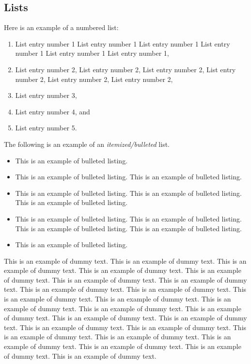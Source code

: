 \documentclass{jpp}
\begin{document}
\subsection{Lists}

Here is an example of a numbered list:

\begin{enumerate}
\item[1.] List entry number 1 List entry number 1 List entry number 1 List entry number 1 List
entry number 1 List entry number 1,
\item[2.] List entry number 2, List entry number 2, List entry number 2, List entry number 2, List
entry number 2, List entry number 2,
\item[3.] List entry number 3,
\item[4.] List entry number 4, and
\item[5.] List entry number 5.
\end{enumerate}

The following is an example of an \textit{itemized/bulleted} list.

\begin{itemize}
\item This is an example of bulleted listing.
\item This is an example of bulleted listing. This is an example of bulleted listing.
\item This is an example of bulleted listing. This is an example of bulleted listing. This is an
example of bulleted listing.
\item This is an example of bulleted listing. This is an example of bulleted listing. This is an
example of bulleted listing. This is an example of bulleted listing.
\item This is an example of bulleted listing.
\end{itemize}

This is an example of dummy text. This is an example of dummy text. This is an example
of dummy text. This is an example of dummy text. This is an example of dummy text. This is
an example of dummy text. This is an example of dummy text. This is an example of dummy
text. This is an example of dummy text. This is an example of dummy text. This is an example
of dummy text. This is an example of dummy text. This is an example of dummy text. This is
an example of dummy text. This is an example of dummy text. This is an example of dummy
text. This is an example of dummy text. This is an example of dummy text. This is an example
of dummy text. This is an example of dummy text. This is an example of dummy text. This is
an example of dummy text. This is an example of dummy text. This is an example of dummy
text.
\end{document}
